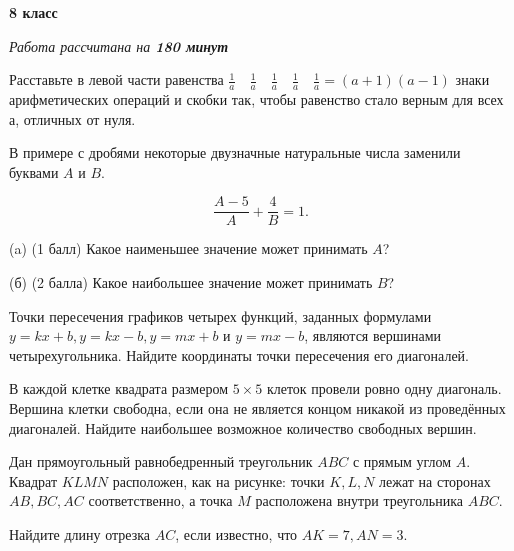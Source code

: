 \centerline{\bf \huge 8 класс}
\centerline{\normalsize{\it Работа рассчитана на \bf{180} минут}}

Расставьте в левой части равенства $\frac{1}{a} \quad \frac{1}{a} \quad \frac{1}{a} \quad \frac{1}{a} \quad \frac{1}{a}=(a+1)(a-1)$ знаки арифметических операций и скобки так, чтобы равенство стало верным для всех а, отличных от нуля.

В примере с дробями некоторые двузначные натуральные числа заменили буквами $A$ и $B$.

$$
\frac{A-5}{A}+\frac{4}{B}=1 .
$$

(a) (1 балл) Какое наименьшее значение может принимать $A$?

(б) (2 балла) Какое наибольшее значение может принимать $B$?

Точки пересечения графиков четырех функций, заданных формулами $y=k x+b, y=k x-b, y=m x+b$ и $y= m x-b$, являются вершинами четырехугольника. Найдите координаты точки пересечения его диагоналей.

В каждой клетке квадрата размером $5 \times 5$ клеток провели ровно одну диагональ. Вершина клетки свободна, если она не является концом никакой из проведённых диагоналей. Найдите наибольшее возможное количество свободных вершин.

Дан прямоугольный равнобедренный треугольник $A B C$ с прямым углом $A$. Квадрат $K L M N$ расположен, как на рисунке: точки $K, L, N$ лежат на сторонах $A B, B C, A C$ соответственно, а точка $M$ расположена внутри треугольника $A B C$.

Найдите длину отрезка $A C$, если известно, что $A K=7, A N=3$.
